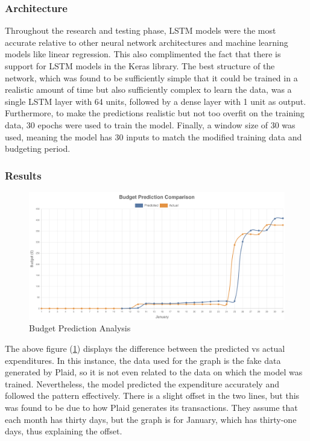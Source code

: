 \subsubsection{Architecture}
Throughout the research and testing phase, LSTM models were the most accurate relative to other neural network architectures and machine learning models like linear regression. This also complimented the fact that there is support for LSTM models in the Keras library. The best structure of the network, which was found to be sufficiently simple that it could be trained in a realistic amount of time but also sufficiently complex to learn the data, was a single LSTM layer with 64 units, followed by a dense layer with 1 unit as output. Furthermore, to make the predictions realistic but not too overfit on the training data, 30 epochs were used to train the model. Finally, a window size of 30 was used, meaning the model has 30 inputs to match the modified training data and budgeting period.

\subsubsection{Results}
\begin{figure}[H]
	\centering
	\includegraphics[width=\textwidth]{images/budget_prediction_comparison.png}
	\caption{Budget Prediction Analysis}
	\label{fig:BudgetPredictionResults}
\end{figure}

The above figure (\ref{fig:BudgetPredictionResults}) displays the difference between the predicted vs actual expenditures. In this instance, the data used for the graph is the fake data generated by Plaid, so it is not even related to the data on which the model was trained. Nevertheless, the model predicted the expenditure accurately and followed the pattern effectively. There is a slight offset in the two lines, but this was found to be due to how Plaid generates its transactions. They assume that each month has thirty days, but the graph is for January, which has thirty-one days, thus explaining the offset.

